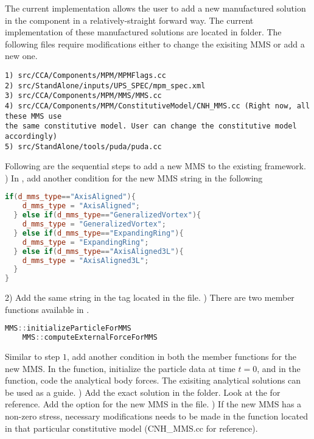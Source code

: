 The current implementation allows the user to add a new manufactured solution in the  component in a relatively-straight forward way. The current implementation of these manufactured solutions are located in  folder.
The following files require modifications either to change the exisiting MMS or add a new one.
\begin{lstlisting}[backgroundcolor=\color{background}]
1) src/CCA/Components/MPM/MPMFlags.cc
2) src/StandAlone/inputs/UPS_SPEC/mpm_spec.xml
3) src/CCA/Components/MPM/MMS/MMS.cc
4) src/CCA/Components/MPM/ConstitutiveModel/CNH_MMS.cc (Right now, all these MMS use
the same constitutive model. User can change the constitutive model accordingly)
5) src/StandAlone/tools/puda/puda.cc
\end{lstlisting}
Following are the sequential steps to add a new MMS to the existing framework. 
) In , add another  condition for the new MMS string in the following 
\begin{lstlisting}[language=Cpp]
if(d_mms_type=="AxisAligned"){
    d_mms_type = "AxisAligned";
  } else if(d_mms_type=="GeneralizedVortex"){
    d_mms_type = "GeneralizedVortex";
  } else if(d_mms_type=="ExpandingRing"){
    d_mms_type = "ExpandingRing";
  } else if(d_mms_type=="AxisAligned3L"){
    d_mms_type = "AxisAligned3L";
  }
}
\end{lstlisting}
2) Add the same string in the  tag located in the  file.
) There are two member functions available in .
\begin{lstlisting}[language=Cpp]
    MMS::initializeParticleForMMS
    MMS::computeExternalForceForMMS
\end{lstlisting}
Similar to step $1$, add another  condition in both the member functions for the new MMS. In the  function, initialize the particle data at time $t=0$, and in the  function, code the analytical body forces. The exisiting analytical solutions can be used as a guide.
) Add the exact solution in the  folder. Look at the  for reference. Add the option for the new MMS in the  file.
) If the new MMS has a non-zero stress, necessary modifications needs to be made in the  function located in that particular constitutive model (CNH\_MMS.cc for reference).

